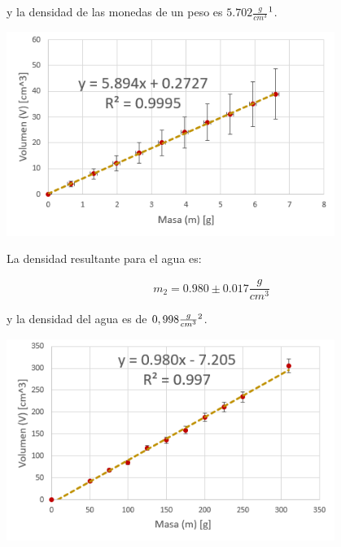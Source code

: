 \documentclass[DIV=calc, paper=a4, fontsize=11pt]{scrartcl}
\newenvironment{Figura}
  {\par\medskip\noindent\minipage{\linewidth}}
  {\endminipage\par\medskip}
\begin{document}
\begin{multicols}{2}
y la densidad de las monedas de un peso es $5.702 \frac{g}{cm^3}$$\footnote{https://www.banxico.org.mx/billetes-y-monedas/moneda-1-peso-familia-c-circu.html}$.

\begin{Figura}
\centering
    \includegraphics[width=0.8\textwidth]{grafica monedas.PNG}
    \label{fig}
\end{Figura}

La densidad resultante para el agua es:

\begin{equation*}
    m_2 = 0.980 \pm 0.017 \frac{g}{cm^3}
\end{equation*}

y la densidad del agua es de $0,998 \frac{g}{cm^3}\footnote{https://www.iagua.es/respuestas/cual-es-densidad-agua}$.

\begin{Figura}
\centering
    \includegraphics[width=0.8\textwidth]{grafica agua.PNG}
    \label{fig}
\end{Figura}



\end{multicols}
\end{document}
